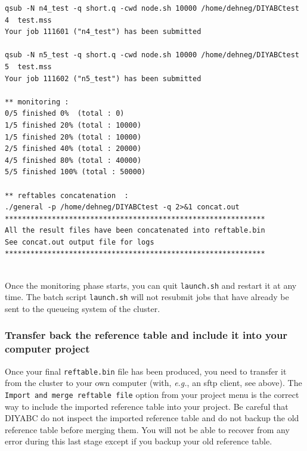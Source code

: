 \begin{minipage}[c]{0.99\textwidth}
\begin{lstlisting}
qsub -N n4_test -q short.q -cwd node.sh 10000 /home/dehneg/DIYABCtest 4  test.mss
Your job 111601 ("n4_test") has been submitted

qsub -N n5_test -q short.q -cwd node.sh 10000 /home/dehneg/DIYABCtest 5  test.mss
Your job 111602 ("n5_test") has been submitted

** monitoring :
0/5 finished 0%  (total : 0)
1/5 finished 20% (total : 10000)
1/5 finished 20% (total : 10000)
2/5 finished 40% (total : 20000)
4/5 finished 80% (total : 40000)
5/5 finished 100% (total : 50000)

** reftables concatenation  :
./general -p /home/dehneg/DIYABCtest -q 2>&1 concat.out
*************************************************************
All the result files have been concatenated into reftable.bin
See concat.out output file for logs
*************************************************************
\end{lstlisting}
%
\end{minipage}\\




Once the monitoring phase starts, you can quit \texttt{launch.sh}
and restart it at any time. The batch script \texttt{launch.sh} will
not resubmit jobs that have already be sent to the queueing system
of the cluster.


\subsubsection{Transfer back the reference table and include it into your computer
project}

\label{clusterback} Once your final \texttt{reftable.bin} file has
been produced, you need to transfer it from the cluster to your own
computer (with, \textit{e.g.}, an sftp client, see above). The \texttt{Import
and merge reftable file} option from your project menu is the correct
way to include the imported reference table into your project. Be
careful that DIYABC do not inspect the imported reference table and
do not backup the old reference table before merging them. You will
not be able to recover from any error during this last stage except
if you backup your old reference table.


